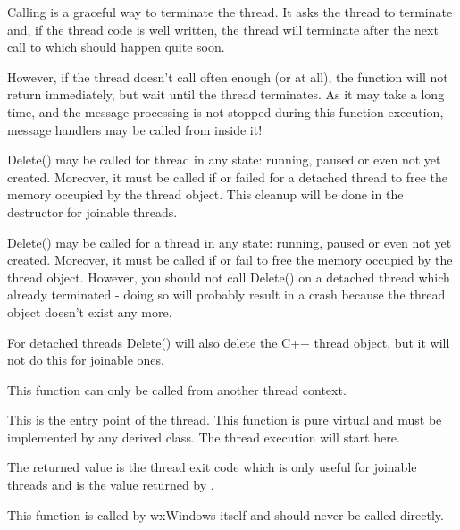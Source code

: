 \label{wxthreaddelete}


Calling  is a graceful way to terminate the
thread. It asks the thread to terminate and, if the thread code is well
written, the thread will terminate after the next call to 
 which should happen quite soon.

However, if the thread doesn't call  
often enough (or at all), the function will not return immediately, but wait
until the thread terminates. As it may take a long time, and the message processing
is not stopped during this function execution, message handlers may be
called from inside it!

Delete() may be called for thread in any state: running, paused or even not yet
created. Moreover, it must be called if  or 
 failed for a detached thread to free the memory
occupied by the thread object. This cleanup will be done in the destructor for joinable
threads.

Delete() may be called for a thread in any state: running, paused or even not yet created. Moreover,
it must be called if  or  fail to free
the memory occupied by the thread object. However, you should not call Delete()
on a detached thread which already terminated - doing so will probably result
in a crash because the thread object doesn't exist any more.

For detached threads Delete() will also delete the C++ thread object, but it
will not do this for joinable ones.

This function can only be called from another thread context.

\label{wxthreadentry}


This is the entry point of the thread. This function is pure virtual and must
be implemented by any derived class. The thread execution will start here.

The returned value is the thread exit code which is only useful for
joinable threads and is the value returned by .

This function is called by wxWindows itself and should never be called
directly.

